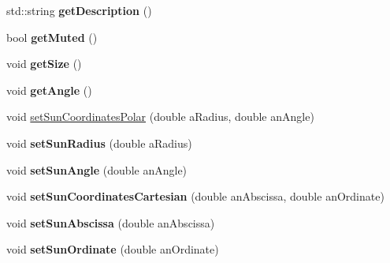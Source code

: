 \begin{DoxyCompactItemize}
\item 
\hypertarget{class_planetary_system_a61a53edb5593a0894f6d472f6d6fc187}{std\-::string {\bfseries get\-Description} ()}\label{class_planetary_system_a61a53edb5593a0894f6d472f6d6fc187}

\item 
\hypertarget{class_planetary_system_afdba5538e5857afa82ec1def1ddf3dda}{bool {\bfseries get\-Muted} ()}\label{class_planetary_system_afdba5538e5857afa82ec1def1ddf3dda}

\item 
\hypertarget{class_planetary_system_afcbf0459c0694f86ed6594dac76ec133}{void {\bfseries get\-Size} ()}\label{class_planetary_system_afcbf0459c0694f86ed6594dac76ec133}

\item 
\hypertarget{class_planetary_system_af9784b5604d3e107d827369d91c80789}{void {\bfseries get\-Angle} ()}\label{class_planetary_system_af9784b5604d3e107d827369d91c80789}

\item 
void \hyperlink{class_planetary_system_ac46b592ee753adf63d50d2b96057a1f5}{set\-Sun\-Coordinates\-Polar} (double a\-Radius, double an\-Angle)
\item 
\hypertarget{class_planetary_system_a2769b5f11e03646bcc038616995cadb5}{void {\bfseries set\-Sun\-Radius} (double a\-Radius)}\label{class_planetary_system_a2769b5f11e03646bcc038616995cadb5}

\item 
\hypertarget{class_planetary_system_a32ab401f05f150125e4661100d709cdf}{void {\bfseries set\-Sun\-Angle} (double an\-Angle)}\label{class_planetary_system_a32ab401f05f150125e4661100d709cdf}

\item 
\hypertarget{class_planetary_system_a513e787e7c85b8dcaaf446200fb9ac87}{void {\bfseries set\-Sun\-Coordinates\-Cartesian} (double an\-Abscissa, double an\-Ordinate)}\label{class_planetary_system_a513e787e7c85b8dcaaf446200fb9ac87}

\item 
\hypertarget{class_planetary_system_ac7b10f1a1c27e8ad5be5de48ca9111ed}{void {\bfseries set\-Sun\-Abscissa} (double an\-Abscissa)}\label{class_planetary_system_ac7b10f1a1c27e8ad5be5de48ca9111ed}

\item 
\hypertarget{class_planetary_system_a099c279c5ebdbdbd8dd3acc31ce5c00d}{void {\bfseries set\-Sun\-Ordinate} (double an\-Ordinate)}\label{class_planetary_system_a099c279c5ebdbdbd8dd3acc31ce5c00d}


\end{DoxyCompactItemize}
